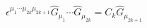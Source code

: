 \begin{equation}
\epsilon^{\mu_{1}\cdots\mu_{2k}\mu_{2k+1}}
\hat{G}_{\mu_{1}}
\cdots\hat{G}_{\mu_{2k}}
=C_{k}\hat{G}_{\mu_{2k+1}}
\label{appnoncommurelationG}
\end{equation}

